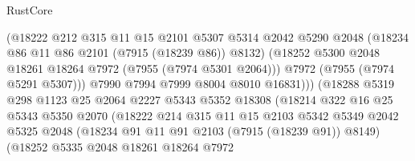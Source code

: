 \begin{lexlean}{RustCore}
\begin{coremodule}
                                  (@18222
                                    @212
                                    @315
                                    @11
                                    @15
                                    @2101
                                    @5307
                                    @5314
                                    @2042
                                    @5290
                                    @2048
                                    (@18234 @86 @11 @86 @2101 (@7915 (@18239 @86)) @8132)
                                    (@18252
                                      @5300
                                      @2048
                                      @18261
                                      @18264
                                      @7972
                                      (@7955 (@7974 @5301 @2064)))
                                    @7972
                                    (@7955 (@7974 @5291 @5307)))
                                  @7990
                                  @7994
                                  @7999
                                  @8004
                                  @8010
                                  @16831)))
                            (@18288
                              @5319
                              @298
                              @1123
                              @25
                              @2064
                              @2227
                              @5343
                              @5352
                              @18308
                              (@18214
                                @322
                                @16
                                @25
                                @5343
                                @5350
                                @2070
                                (@18222
                                  @214
                                  @315
                                  @11
                                  @15
                                  @2103
                                  @5342
                                  @5349
                                  @2042
                                  @5325
                                  @2048
                                  (@18234 @91 @11 @91 @2103 (@7915 (@18239 @91)) @8149)
                                  (@18252
                                    @5335
                                    @2048
                                    @18261
                                    @18264
                                    @7972

\end{coremodule}
\end{lexlean}
